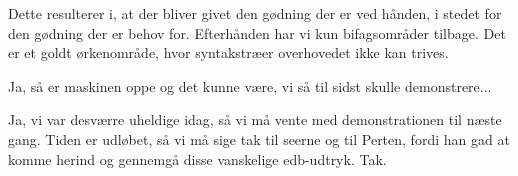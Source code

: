 \documentclass[a4paper,11pt]{article}
\begin{document}
\begin{sketch}
  Dette resulterer i, at der bliver givet den gødning der er ved
  hånden, i stedet for den gødning der er behov for.  Efterhånden har
  vi kun bifagsområder tilbage.  Det er et goldt ørkenområde, hvor
  syntakstræer overhovedet ikke kan trives.


   Ja, så er maskinen oppe og det kunne være, vi så til sidst
  skulle demonstrere...


   Ja, vi var desværre uheldige idag, så vi må vente med
  demonstrationen til næste gang.  Tiden er udløbet, så vi må sige tak
  til seerne og til Perten, fordi han gad at komme herind og gennemgå
  disse vanskelige edb-udtryk.  Tak.

\end{sketch}
\end{document}
